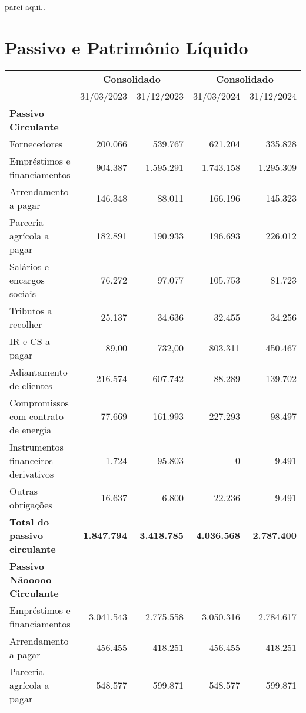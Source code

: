 \documentclass[1pt,a4paper]{article}
\begin{document}
		
		\newpage
		parei aqui..
		\centering\section*{Passivo e Patrimônio Líquido}
		\begin{longtable}{p{6cm} r r r r}
			\toprule
			& \multicolumn{2}{c}{\textbf{Consolidado}} & \multicolumn{2}{c}{\textbf{Consolidado}} \\
			\cmidrule(lr){2-3} \cmidrule(lr){4-5}
			& 31/03/2023 & 31/12/2023 & 31/03/2024 & 31/12/2024 \\
			\midrule
			\endhead
			\textbf{Passivo Circulante} & & & & \\
			Fornecedores & 200.066 & 539.767 & 621.204 & 335.828 \\
			Empréstimos e financiamentos & 904.387 & 1.595.291 & 1.743.158 & 1.295.309 \\
			Arrendamento a pagar & 146.348 & 88.011 & 166.196 & 145.323 \\
			Parceria agrícola a pagar & 182.891 & 190.933 & 196.693 & 226.012 \\
			Salários e encargos sociais & 76.272 & 97.077 & 105.753 & 81.723 \\
			Tributos a recolher & 25.137 & 34.636 & 32.455 & 34.256 \\
			IR e CS a pagar & 89,00 & 732,00 & 803.311 & 450.467 \\
			Adiantamento de clientes & 216.574 & 607.742 & 88.289 & 139.702 \\
			Compromissos com contrato de energia & 77.669 & 161.993 & 227.293 & 98.497 \\
			Instrumentos financeiros derivativos & 1.724 & 95.803 & 0 & 9.491 \\
			Outras obrigações & 16.637 & 6.800 & 22.236 & 9.491 \\
			\rowcolor{darkgray}\textbf{Total do passivo circulante} & \textbf{1.847.794} & \textbf{3.418.785} & \textbf{4.036.568} & \textbf{2.787.400} \\
			\midrule
			\textbf{Passivo Nãooooo Circulante} & & & & \\
			Empréstimos e financiamentos & 3.041.543 & 2.775.558 & 3.050.316 & 2.784.617 \\
			Arrendamento a pagar & 456.455 & 418.251 & 456.455 & 418.251 \\
			Parceria agrícola a pagar & 548.577 & 599.871 & 548.577 & 599.871 \\

\end{longtable}
\end{document}
